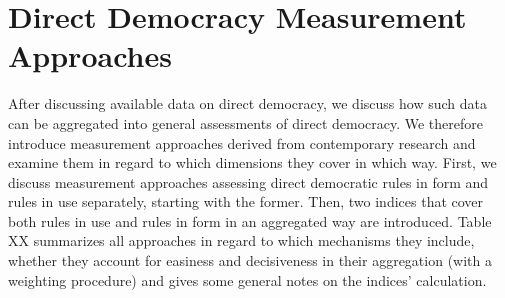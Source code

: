 \documentclass{systats}
\begin{document}
\newpage
\section{Direct Democracy Measurement Approaches} \label{measurement}


After discussing available data on direct democracy, we discuss how such data can be aggregated into general assessments of direct democracy. We therefore introduce measurement approaches derived from contemporary research and examine them in regard to which dimensions they cover in which way. First, we discuss measurement approaches assessing direct democratic rules in form and rules in use separately, starting with the former. Then, two indices that cover both rules in use and rules in form in an aggregated way are introduced. Table XX summarizes all approaches in regard to which mechanisms they include, whether they account for easiness and decisiveness in their aggregation (with a weighting procedure) and gives some general notes on the indices’ calculation.
\end{document}
